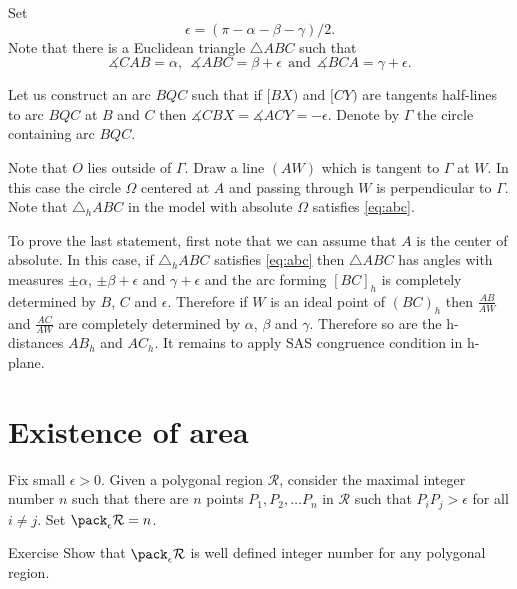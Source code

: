 Set 
$$\epsilon=(\pi-\alpha-\beta-\gamma)/2.$$
Note that there is a Euclidean triangle $\triangle ABC$ such that 
$$\measuredangle CAB=\alpha,\ \ \measuredangle ABC=\beta+\epsilon\ \ \text{and}\ \ \measuredangle BCA=\gamma+\epsilon.$$

Let us construct an arc $BQC$
such that if $[BX)$ and $[CY)$ are tangents half-lines to arc $BQC$
at $B$ and $C$ then $\measuredangle CBX=\measuredangle ACY=-\epsilon$.
Denote by $\Gamma$ the circle containing arc $BQC$.

Note that $O$ lies outside of $\Gamma$.
Draw a line $(AW)$ which is tangent to $\Gamma$ at $W$.
In this case the circle $\Omega$ centered at $A$  and passing through $W$
is perpendicular to $\Gamma$.
Note that $\triangle_h ABC$ in the model with absolute $\Omega$ satisfies \ref{eq:abc}. 

To prove the last statement, first note that we can assume that $A$ is the center of absolute.
In this case, if $\triangle_hABC$ satisfies \ref{eq:abc}
then $\triangle ABC$ has angles with measures 
$\pm \alpha$, $\pm \beta+\epsilon$ and $\gamma+\epsilon$
and the arc forming $[BC]_h$ is completely determined by  $B$, $C$ and $\epsilon$.
Therefore if $W$ is an ideal point of $(BC)_h$ then $\tfrac {AB}{AW}$ and $\tfrac {AC}{AW}$ are completely determined by $\alpha$, $\beta$ and $\gamma$.
Therefore so are the h-distances $AB_h$ and $AC_h$. 
It remains to apply SAS congruence condition in h-plane.
\qeds












\section*{Existence of area}



Fix small $\epsilon>0$.
Given a polygonal region $\mathcal R$,
consider the maximal integer number $n$ such that there are $n$ points $P_1,P_2,\dots P_n$ in $\mathcal R$ such that $P_iP_j>\epsilon$ for all $i\ne j$.
Set $\pack_\epsilon \mathcal R=n$.

\begin{thm}{Exercise}
Show that $\pack_\epsilon \mathcal R$ is well defined integer number for any polygonal region.
\end{thm}

